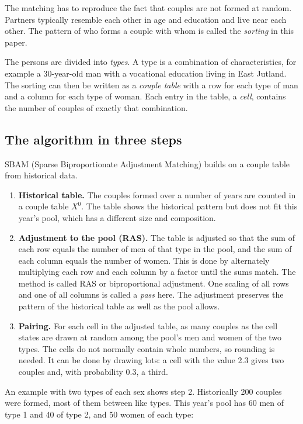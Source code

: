\documentclass[12pt,a4paper]{article}
\begin{document}
The matching has to reproduce the fact that couples are not formed at random. Partners typically
resemble each other in age and education and live near each other. The pattern of who forms a couple
with whom is called the \emph{sorting} in this paper.

The persons are divided into \emph{types}. A type is a combination of characteristics, for example
a 30-year-old man with a vocational education living in East Jutland. The sorting can then be
written as a \emph{couple table} with a row for each type of man and a column for each type of
woman. Each entry in the table, a \emph{cell}, contains the number of couples of exactly that
combination.

\subsection{The algorithm in three steps}

SBAM (Sparse Biproportionate Adjustment Matching) builds on a couple table from historical data.

\begin{enumerate}
\item \textbf{Historical table.} The couples formed over a number of years are counted in a couple
table $X^0$. The table shows the historical pattern but does not fit this year's pool, which has a
different size and composition.

\item \textbf{Adjustment to the pool (RAS).} The table is adjusted so that the sum of each row
equals the number of men of that type in the pool, and the sum of each column equals the number of
women. This is done by alternately multiplying each row and each column by a factor until the sums
match. The method is called RAS or biproportional adjustment. One scaling of all rows and one of
all columns is called a \emph{pass} here. The adjustment preserves the pattern of the historical
table as well as the pool allows.

\item \textbf{Pairing.} For each cell in the adjusted table, as many couples as the cell states are
drawn at random among the pool's men and women of the two types. The cells do not normally contain
whole numbers, so rounding is needed. It can be done by drawing lots: a cell with the value 2.3
gives two couples and, with probability 0.3, a third.
\end{enumerate}

An example with two types of each sex shows step 2. Historically 200 couples were formed, most of
them between like types. This year's pool has 60 men of type 1 and 40 of type 2, and 50 women of
each type:
\end{document}
